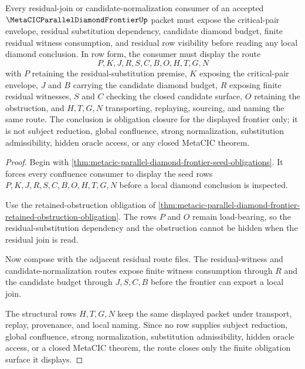 \begin{theorem}
\label{thm:metacic-parallel-diamond-frontier-obligation-closure-route}
Every residual-join or candidate-normalization consumer of an accepted $\MetaCICParallelDiamondFrontierUp$ packet must expose the critical-pair envelope, residual substitution dependency, candidate diamond budget, finite residual witness consumption, and residual row visibility before reading any local diamond conclusion. In row form, the consumer must display the route
$$
P,K,J,R,S,C,B,O,H,T,G,N
$$
with $P$ retaining the residual-substitution premise, $K$ exposing the critical-pair envelope, $J$ and $B$ carrying the candidate diamond budget, $R$ exposing finite residual witnesses, $S$ and $C$ checking the closed candidate surface, $O$ retaining the obstruction, and $H,T,G,N$ transporting, replaying, sourcing, and naming the same route. The conclusion is obligation closure for the displayed frontier only; it is not subject reduction, global confluence, strong normalization, substitution admissibility, hidden oracle access, or any closed MetaCIC theorem.
\end{theorem}
\begin{proof}
Begin with \autoref{thm:metacic-parallel-diamond-frontier-seed-obligations}. It forces every confluence consumer to display the seed rows $P,K,J,R,S,C,B,O,H,T,G,N$ before a local diamond conclusion is inspected.

Use the retained-obstruction obligation of \autoref{thm:metacic-parallel-diamond-frontier-retained-obstruction-obligation}. The rows $P$ and $O$ remain load-bearing, so the residual-substitution dependency and the obstruction cannot be hidden when the residual join is read.

Now compose with the adjacent residual route files. The residual-witness and candidate-normalization routes expose finite witness consumption through $R$ and the candidate budget through $J,S,C,B$ before the frontier can export a local join.

The structural rows $H,T,G,N$ keep the same displayed packet under transport, replay, provenance, and local naming. Since no row supplies subject reduction, global confluence, strong normalization, substitution admissibility, hidden oracle access, or a closed MetaCIC theorem, the route closes only the finite obligation surface it displays.
\end{proof}

